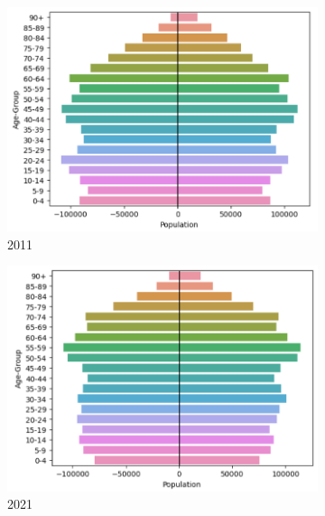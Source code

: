 \documentclass[../thesis.tex]{subfiles}
\begin{document}
\begin{figure}[h!]
\centering
\begin{subfigure}{0.33\textwidth}
    \centering
    \includegraphics[width=\textwidth]{Chapters/Chapter1/Figures/Census2011.png}
    \caption{2011}
\end{subfigure}
\hfill
\begin{subfigure}{0.33\textwidth}
    \centering
    \includegraphics[width=\textwidth]{Chapters/Chapter1/Figures/Census2021.png}
    \caption{2021}
\end{subfigure}\hfill
\begin{subfigure}{0.33\textwidth}
    \centering

\end{subfigure}
\end{figure}
\end{document}
